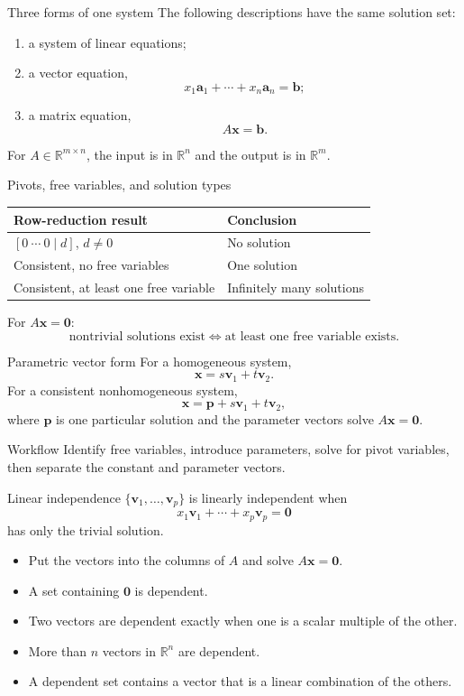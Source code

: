 \documentclass[aspectratio=169]{beamer}
\newcommand{\R}{\mathbb{R}}
\newcommand{\vect}[1]{\mathbf{#1}}
\begin{document}
\begin{frame}{Three forms of one system}
The following descriptions have the same solution set:
\begin{enumerate}
  \item a system of linear equations;
  \item a vector equation,
  \[
  x_1\vect a_1+\cdots+x_n\vect a_n=\vect b;
  \]
  \item a matrix equation,
  \[
  A\vect x=\vect b.
  \]
\end{enumerate}
For $A\in\R^{m\times n}$, the input is in $\R^n$ and the output is in $\R^m$.
\end{frame}

\begin{frame}{Pivots, free variables, and solution types}
\renewcommand{\arraystretch}{1.35}
\begin{center}
\begin{tabular}{>{\raggedright\arraybackslash}p{.34\linewidth}>{\raggedright\arraybackslash}p{.51\linewidth}}
\toprule
Row-reduction result & Conclusion \\
\midrule
$[0\ \cdots\ 0\mid d]$, $d\ne0$ & No solution \\
Consistent, no free variables & One solution \\
Consistent, at least one free variable & Infinitely many solutions \\
\bottomrule
\end{tabular}
\end{center}
\medskip
For $A\vect x=\vect0$:
\[
\text{nontrivial solutions exist}
\iff \text{at least one free variable exists}.
\]
\end{frame}

\begin{frame}{Parametric vector form}
For a homogeneous system,
\[
\vect x=s\vect v_1+t\vect v_2.
\]
For a consistent nonhomogeneous system,
\[
\vect x=\vect p+s\vect v_1+t\vect v_2,
\]
where $\vect p$ is one particular solution and the parameter vectors solve $A\vect x=\vect0$.
\begin{block}{Workflow}
Identify free variables, introduce parameters, solve for pivot variables, then separate the constant and parameter vectors.
\end{block}
\end{frame}

\begin{frame}{Linear independence}
$\{\vect v_1,\ldots,\vect v_p\}$ is linearly independent when
\[
x_1\vect v_1+\cdots+x_p\vect v_p=\vect0
\]
has only the trivial solution.
\begin{itemize}
  \item Put the vectors into the columns of $A$ and solve $A\vect x=\vect0$.
  \item A set containing $\vect0$ is dependent.
  \item Two vectors are dependent exactly when one is a scalar multiple of the other.
  \item More than $n$ vectors in $\R^n$ are dependent.
  \item A dependent set contains a vector that is a linear combination of the others.
\end{itemize}
\end{frame}
\end{document}

